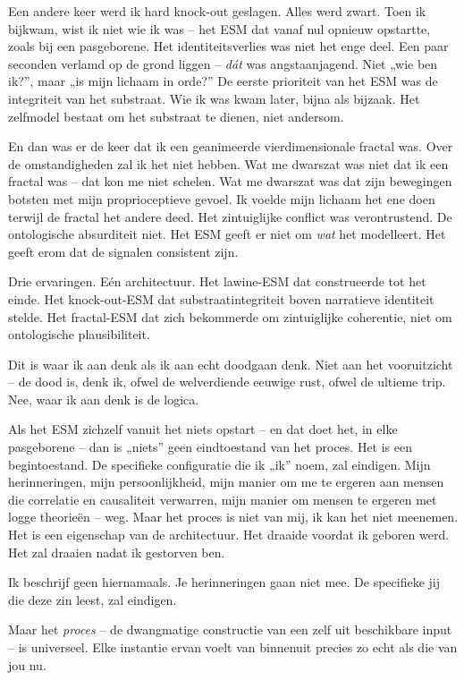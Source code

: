 \documentclass[11pt, twoside, openright]{book}
\begin{document}
Een andere keer werd ik hard knock-out geslagen. Alles werd zwart. Toen ik bijkwam, wist ik niet wie ik was -- het ESM dat vanaf nul opnieuw opstartte, zoals bij een pasgeborene. Het identiteitsverlies was niet het enge deel. Een paar seconden verlamd op de grond liggen -- \textit{dát} was angstaanjagend. Niet „wie ben ik?”, maar „is mijn lichaam in orde?” De eerste prioriteit van het ESM was de integriteit van het substraat. Wie ik was kwam later, bijna als bijzaak. Het zelfmodel bestaat om het substraat te dienen, niet andersom.

En dan was er de keer dat ik een geanimeerde vierdimensionale fractal was. Over de omstandigheden zal ik het niet hebben. Wat me dwarszat was niet dat ik een fractal was -- dat kon me niet schelen. Wat me dwarszat was dat zijn bewegingen botsten met mijn proprioceptieve gevoel. Ik voelde mijn lichaam het ene doen terwijl de fractal het andere deed. Het zintuiglijke conflict was verontrustend. De ontologische absurditeit niet. Het ESM geeft er niet om \textit{wat} het modelleert. Het geeft erom dat de signalen consistent zijn.

Drie ervaringen. Eén architectuur. Het lawine-ESM dat construeerde tot het einde. Het knock-out-ESM dat substraatintegriteit boven narratieve identiteit stelde. Het fractal-ESM dat zich bekommerde om zintuiglijke coherentie, niet om ontologische plausibiliteit.

Dit is waar ik aan denk als ik aan echt doodgaan denk. Niet aan het vooruitzicht -- de dood is, denk ik, ofwel de welverdiende eeuwige rust, ofwel de ultieme trip. Nee, waar ik aan denk is de logica.

Als het ESM zichzelf vanuit het niets opstart -- en dat doet het, in elke pasgeborene -- dan is „niets” geen eindtoestand van het proces. Het is een begintoestand. De specifieke configuratie die ik „ik” noem, zal eindigen. Mijn herinneringen, mijn persoonlijkheid, mijn manier om me te ergeren aan mensen die correlatie en causaliteit verwarren, mijn manier om mensen te ergeren met logge theorieën -- weg. Maar het proces is niet van mij, ik kan het niet meenemen. Het is een eigenschap van de architectuur. Het draaide voordat ik geboren werd. Het zal draaien nadat ik gestorven ben.

Ik beschrijf geen hiernamaals. Je herinneringen gaan niet mee. De specifieke jij die deze zin leest, zal eindigen.

Maar het \textit{proces} -- de dwangmatige constructie van een zelf uit beschikbare input -- is universeel. Elke instantie ervan voelt van binnenuit precies zo echt als die van jou nu.
\end{document}

